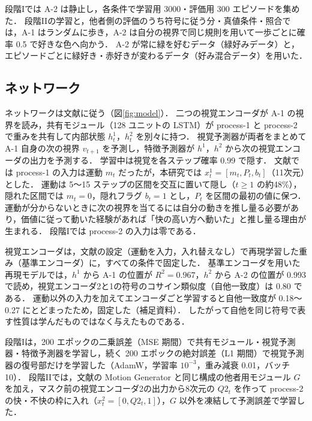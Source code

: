 段階Iでは A-2 は静止し，各条件で学習用 3000・評価用 300 エピソードを集めた．
段階IIの学習と，他者側の評価のうち符号に従う分・真値条件・照合では，A-1 はランダムに歩き，A-2 は自分の視界で同じ規則を用いて一歩ごとに確率 0.5 で好きな色へ向かう．
A-2 が常に緑を好むデータ（緑好みデータ）と，エピソードごとに緑好き・赤好きが変わるデータ（好み混合データ）を用いた．

\subsection{ネットワーク}\label{sec:network}
ネットワークは文献\cite{noguchi2022superposition}に従う（図\ref{fig:model}）．
二つの視覚エンコーダが A-1 の視界を読み，共有モジュール（128 ユニットの LSTM）が process-1 と process-2 で重みを共有して内部状態 $h^1_t$，$h^2_t$ を別々に持つ．
視覚予測器が両者をまとめて A-1 自身の次の視界 $v_{t+1}$ を予測し，特徴予測器が $h^1$，$h^2$ から次の視覚エンコーダの出力を予測する．
学習中は視覚を各ステップ確率 0.99 で隠す．
文献\cite{noguchi2022superposition}では process-1 の入力は運動 $m_t$ だったが，本研究では $x^1_t=[m_t,P_t,b_t]$（11次元）とした．
運動は 5〜15 ステップの区間を交互に置いて隠し（$t\ge1$ の約48\%），隠れた区間では $m_t=0$，隠れフラグ $b_t=1$ とし，$P_t$ を区間の最初の値に保つ．
運動が分からないときに次の視界を当てるには自分の動きを推し量る必要があり，価値に従って動いた経験があれば「快の高い方へ動いた」と推し量る理由が生まれる．
段階Iでは process-2 の入力は零である．

視覚エンコーダは，文献\cite{noguchi2022superposition}の設定（運動を入力，入れ替えなし）で再現学習した重み（基準エンコーダ）に，すべての条件で固定した．
基準エンコーダを用いた再現モデルでは，$h^1$ から A-1 の位置が $R^2=0.967$，$h^2$ から A-2 の位置が 0.993 で読め，視覚エンコーダ2と1の符号のコサイン類似度（自他一致度）は 0.80 である．
運動以外の入力を加えてエンコーダごと学習すると自他一致度が 0.18〜0.27 にとどまったため，固定した（補足資料）．
したがって自他を同じ符号で表す性質は学んだものではなく与えたものである．

段階Iは，200 エポックの二乗誤差（MSE 期間）で共有モジュール・視覚予測器・特徴予測器を学習し，続く 200 エポックの絶対誤差（L1 期間）で視覚予測器の復号部だけを学習した（AdamW，学習率 $10^{-3}$，重み減衰 0.01，バッチ 10）．
段階IIでは，文献\cite{noguchi2022superposition}の Motion Generator と同じ構成の他者用モジュール $G$ を加え，マスク前の視覚エンコーダ2の出力から8次元の $Q2_t$ を作って process-2 の快・不快の枠に入れ（$x^2_t=[0,Q2_t,1]$），$G$ 以外を凍結して予測誤差で学習した．

